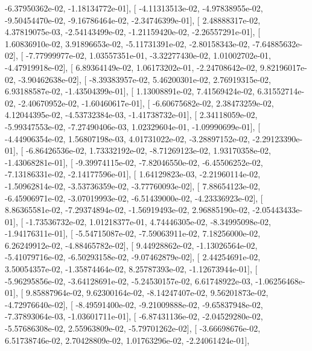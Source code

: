 \documentclass{article}
\begin{document}
         -6.37950362e-02,  -1.18134772e-01],
       [ -4.11313513e-02,  -4.97838955e-02,  -9.50454470e-02,
         -9.16786464e-02,  -2.34746399e-01],
       [  2.48888317e-02,   4.37819075e-03,  -2.54143499e-02,
         -1.21159420e-02,  -2.26557291e-01],
       [  1.60836910e-02,   3.91896653e-02,  -5.11731391e-02,
         -2.80158343e-02,  -7.64885632e-02],
       [ -7.77999977e-02,   1.03557351e-01,  -3.32277430e-02,
          1.01002702e-01,  -4.47919918e-02],
       [  6.89364149e-02,   1.06173202e-01,  -2.24708642e-02,
          9.82196017e-02,  -3.90462638e-02],
       [ -8.39383957e-02,   5.46200301e-02,   2.76919315e-02,
          6.93188587e-02,  -1.43504399e-01],
       [  1.13008891e-02,   7.41569424e-02,   6.31552714e-02,
         -2.40670952e-02,  -1.60460617e-01],
       [ -6.60675682e-02,   2.38473259e-02,   4.12044395e-02,
         -4.53732384e-03,  -1.41738732e-01],
       [  2.34118059e-02,  -5.99347553e-02,  -7.27490406e-03,
          1.02329604e-01,  -1.09990699e-01],
       [ -4.44906354e-02,   1.56807198e-03,   4.01731022e-02,
         -3.28897152e-02,  -2.29123390e-01],
       [ -6.86426536e-02,   1.73332192e-02,  -8.71269123e-02,
          1.93170358e-02,  -1.43068281e-01],
       [ -9.39974115e-02,  -7.82046550e-02,  -6.45506252e-02,
         -7.13186331e-02,  -2.14177596e-01],
       [  1.64129823e-03,  -2.21960114e-02,  -1.50962814e-02,
         -3.53736359e-02,  -3.77760093e-02],
       [  7.88654123e-02,  -6.45906971e-02,  -3.07019993e-02,
         -6.51439000e-02,  -4.23336923e-02],
       [  8.86365581e-02,  -7.29374894e-02,  -1.56919493e-02,
          2.96885190e-02,  -2.05443433e-01],
       [ -1.73536732e-02,   1.01218377e-01,   4.74446305e-02,
         -8.34995098e-02,  -1.94176311e-01],
       [ -5.54715087e-02,  -7.59063911e-02,   7.18256000e-02,
          6.26249912e-02,  -4.88465782e-02],
       [  9.44928862e-02,  -1.13026564e-02,  -5.41079716e-02,
         -6.50293158e-02,  -9.07462879e-02],
       [  2.44254691e-02,   3.50054357e-02,  -1.35874464e-02,
          8.25787393e-02,  -1.12673944e-01],
       [ -5.96295856e-02,  -3.64128691e-02,  -5.24530157e-02,
          6.61748922e-03,  -1.06256468e-01],
       [  9.85887964e-02,   9.62300164e-02,  -8.14247407e-02,
          9.56201873e-02,  -4.72976640e-02],
       [ -8.49591400e-02,  -9.21009888e-02,  -9.65837948e-02,
         -7.37893064e-03,  -1.03601711e-01],
       [ -6.87431136e-02,  -2.04529280e-02,  -5.57686308e-02,
          2.55963809e-02,  -5.79701262e-02],
       [ -3.66698676e-02,   6.51738746e-02,   2.70428809e-02,
          1.01763296e-02,  -2.24061424e-01],
\end{document}
